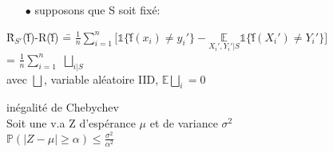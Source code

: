 \documentclass[a4paper]{report}
\begin{document}
\begin{itemize}
\item[$\bullet$]supposons que S soit fixé:\\
\end{itemize}
\begin{tabbing}
\^R$_{S'}$(\~f)-R(\~f) \= = $\frac{1}{n}\displaystyle { \sum_{i=1}^{n}}[\mathds{1}\{$\~f$(x_i)\neq y_i'\}-\underset{X_i', Y_i'|S}{\mathds{E}}\mathds{1}\{$\~f$(X_i')\neq Y_i'\}]$\\
\> = $\frac{1}{n}\displaystyle{\sum_{i=1}^{n}}$ $\bigsqcup _{i|S}$\\
\> avec $\bigsqcup $, variable aléatoire IID, $\mathds{E}\bigsqcup _i = 0$\\
\end{tabbing}
\begin{rappel}
inégalité de Chebychev\\
Soit une v.a Z d’espérance $\mu $ et de variance $\sigma^2$\\
$\mathds{P}(|Z-\mu|\geq \alpha)\leq \frac{\sigma^2}{\alpha^2} $\\
\end{rappel}
\end{document}
